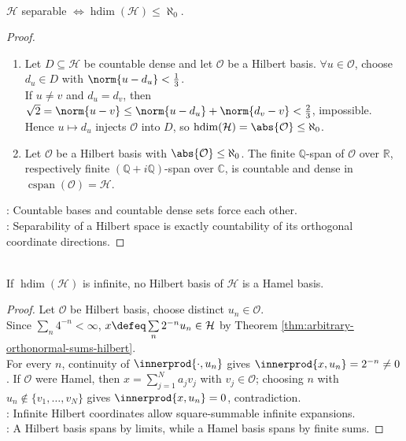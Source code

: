 \begin{corollary} \label{cor:separable-hilbert-space-countable-hilbert-dimension} \\
$\mathcal{H}$ separable $\Longleftrightarrow\operatorname{hdim}(\mathcal{H})\leq\aleph_0$.
\begin{proof}
\begin{enumerate}[label=\roman*.]
\setlength{\itemsep}{0pt}
\item[$(\Rightarrow)$] Let $D\subseteq\mathcal{H}$ be countable dense and let $\mathcal{O}$ be a Hilbert basis. $\forall u\in\mathcal{O}$, choose $d_u\in D$ with $\norm{u-d_u}<\frac{1}{3}$.\\
If $u\neq v$ and $d_u=d_v$, then $\sqrt{2}=\norm{u-v}\leq\norm{u-d_u}+\norm{d_v-v}<\frac{2}{3}$, impossible.\\
Hence $u\mapsto d_u$ injects $\mathcal{O}$ into $D$, so $\operatorname{hdim}(\mathcal{H})=\abs{\mathcal{O}}\leq\aleph_0$.
\item[$(\Leftarrow)$] Let $\mathcal{O}$ be a Hilbert basis with $\abs{\mathcal{O}}\leq\aleph_0$. The finite $\mathbb{Q}$-span of $\mathcal{O}$ over $\mathbb{R}$, respectively finite $(\mathbb{Q}+i\mathbb{Q})$-span over $\mathbb{C}$, is countable and dense in $\operatorname{cspan}(\mathcal{O})=\mathcal{H}$.
\end{enumerate}
: Countable bases and countable dense sets force each other.\\
: Separability of a Hilbert space is exactly countability of its orthogonal coordinate directions.
\end{proof}
\end{corollary}

\begin{corollary} \label{cor:infinite-hilbert-basis-not-hamel} \\
If $\operatorname{hdim}(\mathcal{H})$ is infinite, no Hilbert basis of $\mathcal{H}$ is a Hamel basis.
\begin{proof}
Let $\mathcal O$ be Hilbert basis, choose distinct $u_n\in\mathcal O$.\\
Since $\sum\limits_n4^{-n}<\infty$, $x\defeq\sum\limits_n2^{-n}u_n\in\mathcal H$ by Theorem \ref{thm:arbitrary-orthonormal-sums-hilbert}.\\
For every $n$, continuity of $\innerprod{\cdot,u_n}$ gives $\innerprod{x,u_n}=2^{-n}\neq0$. If $\mathcal O$ were Hamel, then $x=\sum\limits_{j=1}^Na_jv_j$ with $v_j\in\mathcal O$; choosing $n$ with $u_n\notin\{v_1,\ldots,v_N\}$ gives $\innerprod{x,u_n}=0$, contradiction.\\
: Infinite Hilbert coordinates allow square-summable infinite expansions.\\
: A Hilbert basis spans by limits, while a Hamel basis spans by finite sums.
\end{proof}
\end{corollary}

